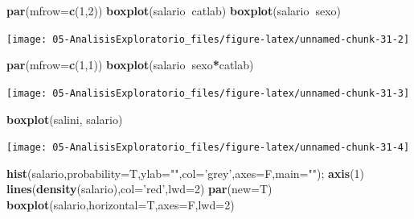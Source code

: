 \documentclass[]{book}
\newenvironment{Shaded}{\begin{snugshade}}{\end{snugshade}}
\newcommand{\DataTypeTok}[1]{\textcolor[rgb]{0.13,0.29,0.53}{#1}}
\newcommand{\DecValTok}[1]{\textcolor[rgb]{0.00,0.00,0.81}{#1}}
\newcommand{\KeywordTok}[1]{\textcolor[rgb]{0.13,0.29,0.53}{\textbf{#1}}}
\newcommand{\NormalTok}[1]{#1}
\newcommand{\OperatorTok}[1]{\textcolor[rgb]{0.81,0.36,0.00}{\textbf{#1}}}
\newcommand{\StringTok}[1]{\textcolor[rgb]{0.31,0.60,0.02}{#1}}
\begin{document}
\begin{Shaded}
\begin{Highlighting}[]
\KeywordTok{par}\NormalTok{(}\DataTypeTok{mfrow=}\KeywordTok{c}\NormalTok{(}\DecValTok{1}\NormalTok{,}\DecValTok{2}\NormalTok{))}
\KeywordTok{boxplot}\NormalTok{(salario}\OperatorTok{~}\NormalTok{catlab)}
\KeywordTok{boxplot}\NormalTok{(salario}\OperatorTok{~}\NormalTok{sexo)}
\end{Highlighting}
\end{Shaded}

\begin{center}\texttt{[image: 05-AnalisisExploratorio\_files/figure-latex/unnamed-chunk-31-2]} \end{center}

\begin{Shaded}
\begin{Highlighting}[]
\KeywordTok{par}\NormalTok{(}\DataTypeTok{mfrow=}\KeywordTok{c}\NormalTok{(}\DecValTok{1}\NormalTok{,}\DecValTok{1}\NormalTok{))}
\KeywordTok{boxplot}\NormalTok{(salario}\OperatorTok{~}\NormalTok{sexo}\OperatorTok{*}\NormalTok{catlab)}
\end{Highlighting}
\end{Shaded}

\begin{center}\texttt{[image: 05-AnalisisExploratorio\_files/figure-latex/unnamed-chunk-31-3]} \end{center}

\begin{Shaded}
\begin{Highlighting}[]
\KeywordTok{boxplot}\NormalTok{(salini, salario)}
\end{Highlighting}
\end{Shaded}

\begin{center}\texttt{[image: 05-AnalisisExploratorio\_files/figure-latex/unnamed-chunk-31-4]} \end{center}

\begin{Shaded}
\begin{Highlighting}[]
\KeywordTok{hist}\NormalTok{(salario,}\DataTypeTok{probability=}\NormalTok{T,}\DataTypeTok{ylab=}\StringTok{""}\NormalTok{,}\DataTypeTok{col=}\StringTok{'grey'}\NormalTok{,}\DataTypeTok{axes=}\NormalTok{F,}\DataTypeTok{main=}\StringTok{""}\NormalTok{); }\KeywordTok{axis}\NormalTok{(}\DecValTok{1}\NormalTok{)}
\KeywordTok{lines}\NormalTok{(}\KeywordTok{density}\NormalTok{(salario),}\DataTypeTok{col=}\StringTok{'red'}\NormalTok{,}\DataTypeTok{lwd=}\DecValTok{2}\NormalTok{)}
\KeywordTok{par}\NormalTok{(}\DataTypeTok{new=}\NormalTok{T)}
\KeywordTok{boxplot}\NormalTok{(salario,}\DataTypeTok{horizontal=}\NormalTok{T,}\DataTypeTok{axes=}\NormalTok{F,}\DataTypeTok{lwd=}\DecValTok{2}\NormalTok{)}
\end{Highlighting}
\end{Shaded}
\end{document}
